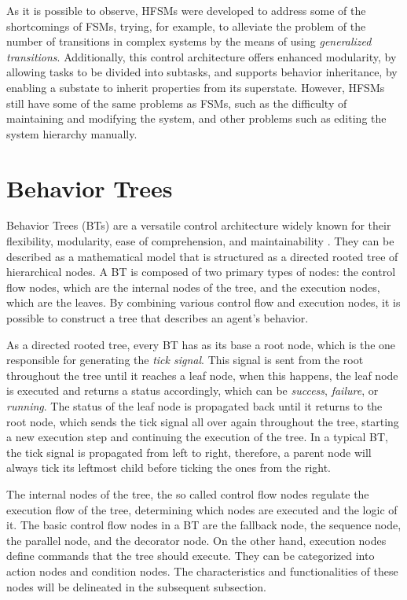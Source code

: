 As it is possible to observe, HFSMs were developed to address some of the shortcomings of FSMs, trying, for example, to alleviate the problem of the number of transitions in complex systems by the means of using \textit{generalized transitions}. Additionally, this control architecture offers enhanced modularity, by allowing tasks to be divided into subtasks, and supports behavior inheritance, by enabling a substate to inherit properties from its superstate. However, HFSMs still have some of the same problems as FSMs, such as the difficulty of maintaining and modifying the system, and other problems such as editing the system hierarchy manually.

\section{Behavior Trees}

Behavior Trees (BTs) are a versatile control architecture widely known for their flexibility, modularity, ease of comprehension, and maintainability \cite{BTsInRobotics}. They can be described as a mathematical model that is structured as a directed rooted tree of hierarchical nodes. A BT is composed of two primary types of nodes: the control flow nodes, which are the internal nodes of the tree, and the execution nodes, which are the leaves. By combining various control flow and execution nodes, it is possible to construct a tree that describes an agent's behavior.

As a directed rooted tree, every BT has as its base a root node, which is the one responsible for generating the \textit{tick signal}. This signal is sent from the root throughout the tree until it reaches a leaf node, when this happens, the leaf node is executed and returns a status accordingly, which can be \textit{success}, \textit{failure}, or \textit{running}. The status of the leaf node is propagated back until it returns to the root node, which sends the tick signal all over again throughout the tree, starting a new execution step and continuing the execution of the tree. In a typical BT, the tick signal is propagated from left to right, therefore, a parent node will always tick its leftmost child before ticking the ones from the right.

The internal nodes of the tree, the so called control flow nodes regulate the execution flow of the tree, determining which nodes are executed and the logic of it. The basic control flow nodes in a BT are the fallback node, the sequence node, the parallel node, and the decorator node. On the other hand, execution nodes define commands that the tree should execute. They can be categorized into action nodes and condition nodes. The characteristics and functionalities of these nodes will be delineated in the subsequent subsection.

